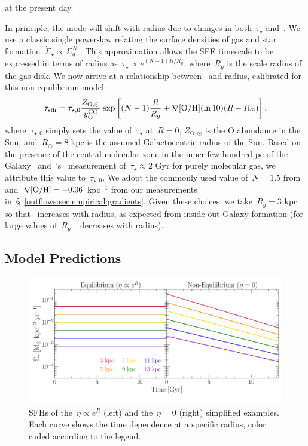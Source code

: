 at the present day.
\par
In principle, the mode will shift with radius due to changes in
both~$\tau_\star$ and~.
We use a classic single power-law relating the surface densities of gas and
star formation~$\dot{\Sigma}_\star \propto \Sigma_g^N$
\citep[e.g.,][]{Kennicutt1998}.
This approximation allows the SFE timescale to be expressed in terms of radius
as~$\tau_\star \propto e^{(N - 1) R / R_g}$, where~$R_g$ is the scale radius of
the gas disk.
We now arrive at a relationship between~ and radius, calibrated
for this non-equilibrium model:
\begin{equation}
\tau_\text{sfh} = \tau_{\star,0} \frac{Z_{\text{O},\odot}}{y_\text{O}^\text{CC}}
\exp\left[(N - 1)\frac{R}{R_g} + \nabla\text{[O/H]} (\ln 10)(R - R_\odot)\right],
\label{outflows:eq:tausfh-radius}
\end{equation}
where~$\tau_{\star,0}$ simply sets the value of~$\tau_\star$ at~$R = 0$,
$Z_{\text{O},\odot}$ is the O abundance in the Sun, and~$R_\odot = 8$ kpc is
the assumed Galactocentric radius of the Sun.
Based on the presence of the central molecular zone in the inner few hundred pc
of the Galaxy~\citep[e.g.,][]{Morris1996, Dahmen1998, PiercePrice2000,
Hatchfield2020} and~\citeauthor{Leroy2008}'s~\citeyearpar{Leroy2008}
measurement of~$\tau_\star \approx 2$ Gyr for purely molecular gas, we
attribute this value to~$\tau_{\star,0}$.
We adopt the commonly used value of~$N = 1.5$ from~\citet{Kennicutt1998}
and~$\nabla\text{[O/H]} = -0.06$ kpc$^{-1}$ from our measurements
in~\S~\ref{outflows:sec:empirical:gradients}.
Given these choices, we take~$R_g = 3$ kpc so that~ increases
with radius, as expected from inside-out Galaxy formation (for large values
of~$R_g$,~ decreases with radius).

\subsection{Model Predictions}
\label{outflows:sec:gce:predictions}

\begin{figure}
\centering
\includegraphics[scale = 0.5]{simplified-examples-sfhs.pdf}
\caption{
SFHs of the~$\eta \propto e^R$ (left) and the~$\eta = 0$ (right) simplified
examples.
Each curve shows the time dependence at a specific radius, color coded
according to the legend.
}
\label{outflows:fig:simplified-examples-sfhs}
\end{figure}

